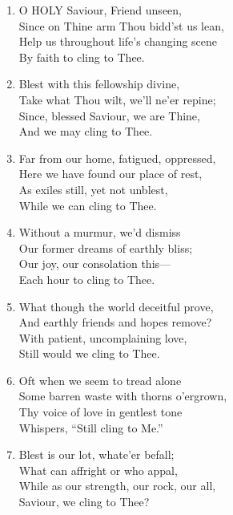 \documentclass[11pt,a4paper]{article}
\begin{document}
\begin{enumerate}
    \item O HOLY Saviour, Friend unseen, \\
        Since on Thine arm Thou bidd'st us lean, \\
        Help us throughout life's changing scene \\
        By faith to cling to Thee.

    \item Blest with this fellowship divine, \\
        Take what Thou wilt, we'll ne'er repine; \\
        Since, blessed Saviour, we are Thine, \\
        And we may cling to Thee.

    \item Far from our home, fatigued, oppressed, \\
        Here we have found our place of rest, \\
        As exiles still, yet not unblest, \\
        While we can cling to Thee.

    \item Without a murmur, we'd dismiss \\
        Our former dreams of earthly bliss; \\
        Our joy, our consolation this--- \\
        Each hour to cling to Thee.

    \item What though the world deceitful prove, \\
        And earthly friends and hopes remove? \\
        With patient, uncomplaining love, \\
        Still would we cling to Thee.

    \item Oft when we seem to tread alone \\
        Some barren waste with thorns o'ergrown, \\
        Thy voice of love in gentlest tone \\
        Whispers, ``Still cling to Me.''

    \item Blest is our lot, whate'er befall; \\
        What can affright or who appal, \\
        While as our strength, our rock, our all, \\
        Saviour, we cling to Thee?

\end{enumerate}
\end{document}

